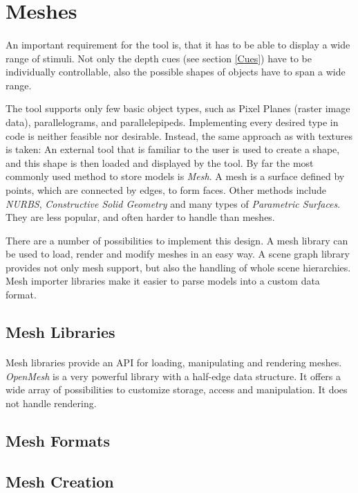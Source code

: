 \section{Meshes\label{Meshes}}
\paragraph{}
An important requirement for the tool is, that it has to be able to display a wide range of stimuli. Not only the depth cues (see section \ref{Cues}) have to be individually controllable, also the possible shapes of objects have to span a wide range.

The tool supports only few basic object types, such as Pixel Planes (raster image data), parallelograms, and parallelepipeds. Implementing every desired type in code is neither feasible nor desirable.
Instead, the same approach as with textures is taken: An external tool that is familiar to the user is used to create a shape, and this shape is then loaded and displayed by the tool. By far the most commonly used method to store models is \textit{Mesh}. A mesh is a surface defined by points, which are connected by edges, to form faces. Other methods include \textit{NURBS}, \textit{Constructive Solid Geometry} and many types of \textit{Parametric Surfaces}. They are less popular, and often harder to handle than meshes.

There are a number of possibilities to implement this design. A mesh library can be used to load, render and modify meshes in an easy way. A scene graph library provides not only mesh support, but also the handling of whole scene hierarchies. Mesh importer libraries make it easier to parse models into a custom data format.


\subsection{Mesh Libraries}
\paragraph{}
Mesh libraries provide an API for loading, manipulating and rendering meshes. \textit{OpenMesh} is a very powerful library with a half-edge data structure. It offers a wide array of possibilities to customize storage, access and manipulation. It does not handle rendering.

\paragraph{}


\subsection{Mesh Formats}
\paragraph{}

\subsection{Mesh Creation}
\paragraph{}
